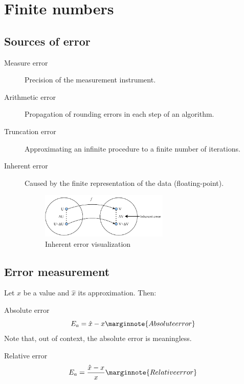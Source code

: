 \chapter{Finite numbers}



\section{Sources of error}

\begin{description}
    \item[Measure error] 
        Precision of the measurement instrument.

    \item[Arithmetic error] 
        Propagation of rounding errors in each step of an algorithm.

    \item[Truncation error] 
        Approximating an infinite procedure to a finite number of iterations.

    \item[Inherent error] 
        Caused by the finite representation of the data (floating-point).
        \begin{figure}[h]
            \centering
            \includegraphics[width=0.6\textwidth]{img/_inherent_error.pdf}
            \caption{Inherent error visualization}
        \end{figure}
\end{description}



\section{Error measurement}

Let $x$ be a value and $\hat{x}$ its approximation. Then:
\begin{descriptionlist}
    \item[Absolute error] 
        \[
            E_{a} = \hat{x} - x 
            \marginnote{Absolute error}
        \] 
        Note that, out of context, the absolute error is meaningless.
    \item[Relative error] 
        \[
            E_{a} = \frac{\hat{x} - x}{x} 
            \marginnote{Relative error}
        \] 
\end{descriptionlist}



